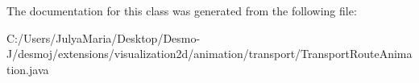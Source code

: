 The documentation for this class was generated from the following file\-:\begin{DoxyCompactItemize}
\item 
C\-:/\-Users/\-Julya\-Maria/\-Desktop/\-Desmo-\/\-J/desmoj/extensions/visualization2d/animation/transport/Transport\-Route\-Animation.\-java\end{DoxyCompactItemize}
